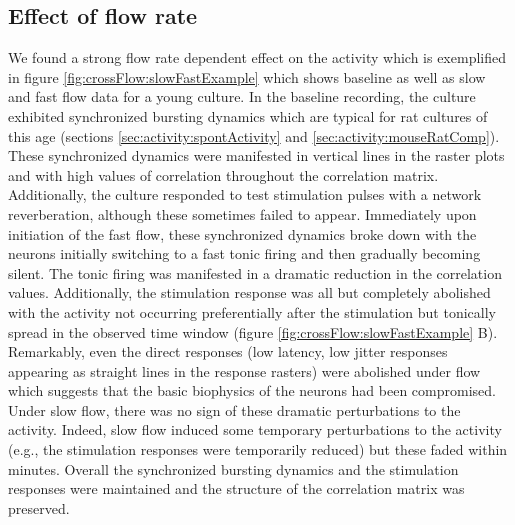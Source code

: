         \subsection{Effect of flow rate}
        \label{sec:crossFlow:slowFast}
        We found a strong flow rate dependent effect on the activity which is exemplified in figure \ref{fig:crossFlow:slowFastExample} which shows baseline as well as slow and fast flow data for a young culture. In the baseline recording, the culture exhibited synchronized bursting dynamics which are typical for rat cultures of this age (sections \ref{sec:activity:spontActivity} and \ref{sec:activity:mouseRatComp}). These synchronized dynamics were manifested in vertical lines in the raster plots and with high values of correlation throughout the correlation matrix. Additionally, the culture responded to test stimulation pulses with a network reverberation, although these sometimes failed to appear. Immediately upon initiation of the fast flow, these synchronized dynamics broke down with the neurons initially switching to a fast tonic firing and then gradually becoming silent. The tonic firing was manifested in a dramatic reduction in the correlation values. Additionally, the stimulation response was all but completely abolished with the activity not occurring preferentially after the stimulation but tonically spread in the observed time window (figure \ref{fig:crossFlow:slowFastExample} B). Remarkably, even the direct responses (low latency, low jitter responses appearing as straight lines in the response rasters) were abolished under flow which suggests that the basic biophysics of the neurons had been compromised. Under slow flow, there was no sign of these dramatic perturbations to the activity. Indeed, slow flow induced some temporary perturbations to the activity (e.g., the stimulation responses were temporarily reduced) but these faded within minutes. Overall the synchronized bursting dynamics and the stimulation responses were maintained and the structure of the correlation matrix was preserved.

